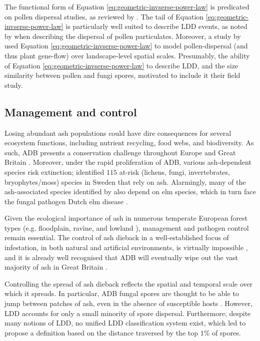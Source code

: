 The functional form of Equation \ref{eq:geometric-invserse-power-law} is predicated on pollen dispersal studies,
as reviewed by \cite{nathan2012dispersal}. The tail of Equation \ref{eq:geometric-invserse-power-law} is 
particularly well suited to describe LDD events, as noted by \cite{https://doi.org/10.1111/j.1365-294X.2004.02100.x}
when describing the dispersal of pollen particulates. Moreover, a study by \cite{https://doi.org/10.1111/j.1365-294X.2006.03155.x}
used Equation \ref{eq:geometric-invserse-power-law} to model pollen-dispersal (and thus plant gene-flow) over landscape-level spatial scales. 
Presumably, the ability of Equation \ref{eq:geometric-invserse-power-law} to describe LDD, and the size similarity between pollen and fungi spores, 
motivated \cite{grosdidier2018tracking} to include it their field study. 

\subsection{Management and control}

Losing abundant ash populations could have dire consequences for several ecosystem functions, 
including nutrient recycling, food webs, and biodiversity.
As such, ADB presents a conservation challenge throughout Europe and Great Britain \cite{pautasso2013european}.
Moreover, under the rapid proliferation of ADB, various ash-dependent species risk extinction;
\cite{hultberg2020ash} identified $115$ at-risk (lichens, fungi, invertebrates, bryophytes/moss) species in Sweden that rely on ash.
Alarmingly, many of the ash-associated species identified by \cite{hultberg2020ash} also depend on elm species, which in turn face 
the fungal pathogen Dutch elm disease \cite{brasier1991ophiostoma}.

Given the ecological importance of ash in numerous temperate European forest types (e.g. floodplain, ravine, 
and lowland \cite{dobrowolska2011review}), management and pathogen control remain essential. The control of ash dieback
in a well-established focus of infestation, in both natural and artificial environments, is virtually impossible
\cite{havrdova2017environmental}, and it is already well recognised that ADB will eventually wipe out the vast 
majority of ash in Great Britain \cite{ash-dieback-costs}.

Controlling the spread of ash dieback reflects the spatial and temporal scale over which it spreads.
In particular, ADB fungal spores are thought to be able to jump between patches of ash,
even in the absence of susceptible hosts \cite{wingen2013long}.
However, LDD accounts for only a small minority of spore dispersal.
Furthermore, despite many notions of LDD, no unified LDD classification system exist, 
which led \cite{golan2017long} to propose a definition based on the distance traversed by the top $1\%$ of spores.

